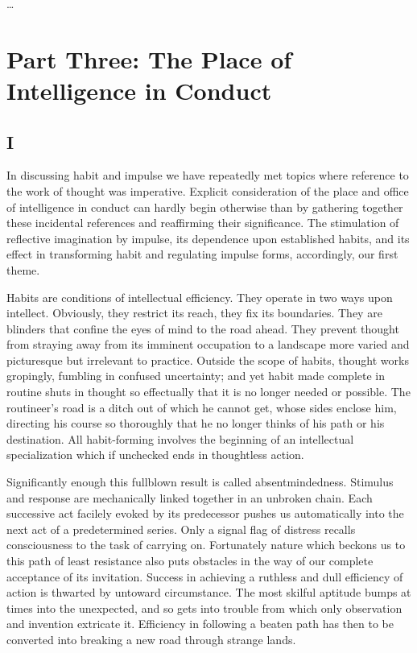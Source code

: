 \documentclass[12pt]{article}
\begin{document}
\bigskip
\centerline{\ldots}

\section*{Part Three: The Place of Intelligence in Conduct}

\subsection*{I}

In discussing habit and impulse we have repeatedly
met topics where reference to the work of thought was
imperative. Explicit consideration of the place and
office of intelligence in conduct can hardly begin otherwise
than by gathering together these incidental references
and reaffirming their significance. The stimulation
of reflective imagination by impulse, its dependence
upon established habits, and its effect in transforming
habit and regulating impulse forms, accordingly,
our first theme.

Habits are conditions of intellectual efficiency. They
operate in two ways upon intellect. Obviously, they
restrict its reach, they fix its boundaries. They are
blinders that confine the eyes of mind to the road ahead.
They prevent thought from straying away from its imminent
occupation to a landscape more varied and
picturesque but irrelevant to practice. Outside the
scope of habits, thought works gropingly, fumbling in
confused uncertainty; and yet habit made complete in
routine shuts in thought so effectually that it is no
longer needed or possible. The routineer's road is a
ditch out of which he cannot get, whose sides enclose
him, directing his course so thoroughly that he no
longer thinks of his path or his destination. All habit-forming
involves the beginning of an intellectual specialization
which if unchecked ends in thoughtless
action.

Significantly enough this fullblown result is called
absentmindedness. Stimulus and response are mechanically
linked together in an unbroken chain. Each successive
act facilely evoked by its predecessor pushes us
automatically into the next act of a predetermined series.
Only a signal flag of distress recalls consciousness
to the task of carrying on. Fortunately nature which
beckons us to this path of least resistance also puts
obstacles in the way of our complete acceptance of its
invitation. Success in achieving a ruthless and dull
efficiency of action is thwarted by untoward circumstance.
The most skilful aptitude bumps at times into
the unexpected, and so gets into trouble from which
only observation and invention extricate it. Efficiency
in following a beaten path has then to be converted
into breaking a new road through strange lands.
\end{document}
